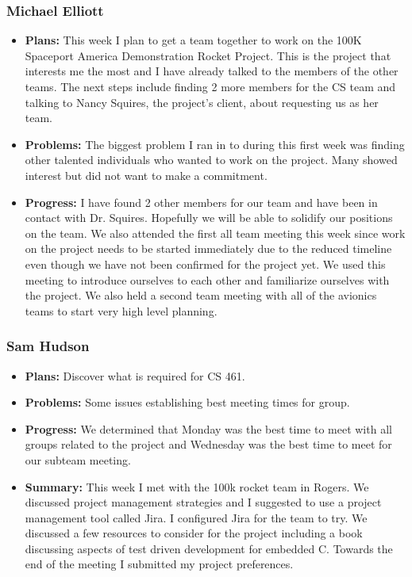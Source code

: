 \documentclass[onecolumn, draftclsnofoot,10pt, compsoc]{IEEEtran}
\begin{document}
\subsubsection{Michael Elliott}
\begin {itemize}
\item \textbf{Plans: }
 This week I plan to get a team together to work on the 100K Spaceport America Demonstration Rocket Project. This is the project that interests me the most and I have already talked to the members of the other teams. The next steps include finding 2 more members for the CS team and talking to Nancy Squires, the project's client, about requesting us as her team.
\item \textbf{Problems: }
  The biggest problem I ran in to during this first week was finding other talented individuals who wanted to work on the project. Many showed interest but did not want to make a commitment.
\item \textbf{Progress: }
  I have found 2 other members for our team and have been in contact with Dr. Squires. Hopefully we will be able to solidify our positions on the team. We also attended the first all team meeting this week since work on the project needs to be started immediately due to the reduced timeline even though we have not been confirmed for the project yet. We used this meeting to introduce ourselves to each other and familiarize ourselves with the project. We also held a second team meeting with all of the avionics teams to start very high level planning.
\end {itemize}
\subsubsection{Sam Hudson}
\begin {itemize}
\item \textbf{Plans: }Discover what is required for CS 461.
\item \textbf{Problems: }Some issues establishing best meeting times for group.
\item \textbf{Progress: }We determined that Monday was the best time to meet with all groups related to the project and Wednesday was the best time to meet for our subteam meeting.
\item \textbf{Summary: }This week I met with the 100k rocket team in Rogers. We discussed project management strategies and I suggested to use a project management tool called Jira. I configured Jira for the team to try. We discussed a few resources to consider for the project including a book discussing aspects of test driven development for embedded C. Towards the end of the meeting I submitted my project preferences. 
\end {itemize}
\end{document}
